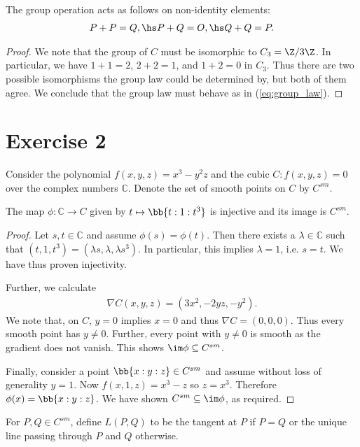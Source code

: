 \documentclass{article}
\begin{document}
\begin{claim*}[3]
  The group operation acts as follows on non-identity elements:
  \begin{align}\label{eq:group_law}
    P+P=Q, \hs P+Q=O, \hs Q+Q=P.
  \end{align}
  \begin{proof}
    We note that the group of $C$ must be isomorphic to $C_3=\Z/3\Z$. In particular,
    we have $1+1=2$, $2+2=1$, and $1+2=0$ in $C_3$. Thus there are two possible
    isomorphisms the group law could be determined by, but both of them agree.
    We conclude that the group law must behave as in (\ref{eq:group_law}).
  \end{proof}
\end{claim*}

\section*{Exercise 2}

Consider the polynomial $f(x,y,z)=x^3-y^2z$ and the cubic $C:f(x,y,z)=0$ over the
complex numbers $\mathbb C$. Denote the set of smooth points on $C$ by $C^{sm}$.

\begin{claim*}[1]
  The map $\phi:\mathbb C\to C$ given by $t\mapsto\bb{t:1:t^3}$ is injective and its image is
  $C^{sm}$.
  \begin{proof}
    Let $s,t\in\mathbb C$ and assume $\phi(s)=\phi(t)$. Then there exists a $\lambda\in\mathbb C$
    such that $(t,1,t^3)=(\lambda s,\lambda,\lambda s^3)$. In particular, this implies
    $\lambda=1$, i.e. $s=t$. We have thus proven injectivity.

    Further, we calculate
    \begin{align*}
      \nabla C(x,y,z)=(3x^2, -2yz, -y^2).
    \end{align*}
    We note that, on $C$, $y=0$ implies $x=0$ and thus $\nabla C=(0,0,0)$. Thus every smooth
    point has $y\neq 0$. Further, every point with $y\neq 0$ is smooth as the gradient
    does not vanish. This shows $\im\phi\subseteq C^{sm}$.

    Finally, consider a point $\bb{x:y:z}\in C^{sm}$ and assume without loss of generality
    $y=1$. Now $f(x,1,z)=x^3-z$ so $z=x^3$. Therefore $\phi(x)=\bb{x:y:z}$. We have shown
    $C^{sm}\subseteq\im\phi$, as required.
  \end{proof}
\end{claim*}

For $P,Q\in C^{sm}$, define $L(P,Q)$ to be the tangent at $P$ if $P=Q$ or the unique line
passing through $P$ and $Q$ otherwise.
\end{document}
